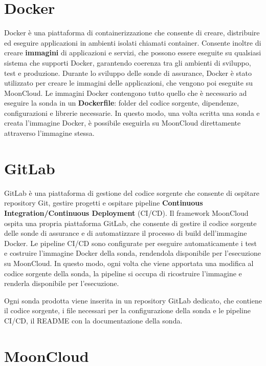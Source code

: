 \section{Docker}
\label{sec:docker}

Docker è una piattaforma di containerizzazione che consente di creare, distribuire ed eseguire applicazioni in ambienti isolati chiamati container. Consente inoltre di creare \textbf{immagini} di applicazioni e servizi, che possono essere eseguite su qualsiasi sistema che supporti Docker, garantendo coerenza tra gli ambienti di sviluppo, test e produzione. Durante lo sviluppo delle sonde di assurance, Docker è stato utilizzato per creare le immagini delle applicazioni, che vengono poi eseguite su MoonCloud. Le immagini Docker contengono tutto quello che è necessario ad eseguire la sonda in un \textbf{Dockerfile}: folder del codice sorgente, dipendenze, configurazioni e librerie necessarie. In questo modo, una volta scritta una sonda e creata l'immagine Docker, è possibile eseguirla su MoonCloud direttamente attraverso l'immagine stessa.

\section{GitLab}
\label{sec:gitlab}

GitLab è una piattaforma di gestione del codice sorgente che consente di ospitare repository Git, gestire progetti e ospitare pipeline \textbf{Continuous Integration/Continuous Deployment} (CI/CD). Il framework MoonCloud ospita una propria piattaforma GitLab, che consente di gestire il codice sorgente delle sonde di assurance e di automatizzare il processo di build dell'immagine Docker. Le pipeline CI/CD sono configurate per eseguire automaticamente i test e costruire l'immagine Docker della sonda, rendendola disponibile per l'esecuzione su MoonCloud. In questo modo, ogni volta che viene apportata una modifica al codice sorgente della sonda, la pipeline si occupa di ricostruire l'immagine e renderla disponibile per l'esecuzione.

Ogni sonda prodotta viene inserita in un repository GitLab dedicato, che contiene il codice sorgente, i file necessari per la configurazione della sonda e le pipeline CI/CD, il README con la documentazione della sonda. 

\section{MoonCloud}
\label{sec:mooncloud}

